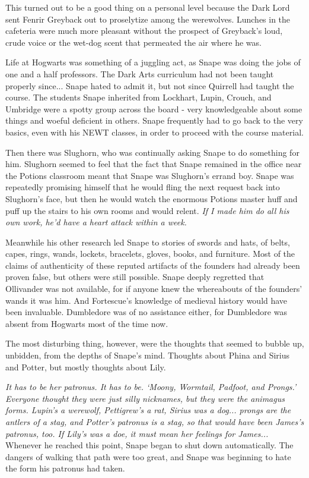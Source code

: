 \documentclass[a4paper,11pt]{article}
\begin{document}
This turned out to be a good thing on a personal level because the Dark Lord sent Fenrir Greyback out to proselytize among the werewolves. Lunches in the cafeteria were much more pleasant without the prospect of Greyback's loud, crude voice or the wet-dog scent that permeated the air where he was.

Life at Hogwarts was something of a juggling act, as Snape was doing the jobs of one and a half professors. The Dark Arts curriculum had not been taught properly since... Snape hated to admit it, but not since Quirrell had taught the course. The students Snape inherited from Lockhart, Lupin, Crouch, and Umbridge were a spotty group across the board - very knowledgeable about some things and woeful deficient in others. Snape frequently had to go back to the very basics, even with his NEWT classes, in order to proceed with the course material.

Then there was Slughorn, who was continually asking Snape to do something for him. Slughorn seemed to feel that the fact that Snape remained in the office near the Potions classroom meant that Snape was Slughorn's errand boy. Snape was repeatedly promising himself that he would fling the next request back into Slughorn's face, but then he would watch the enormous Potions master huff and puff up the stairs to his own rooms and would relent. \emph{If I made him do all his own work, he'd have a heart attack within a week.}

Meanwhile his other research led Snape to stories of swords and hats, of belts, capes, rings, wands, lockets, bracelets, gloves, books, and furniture. Most of the claims of authenticity of these reputed artifacts of the founders had already been proven false, but others were still possible. Snape deeply regretted that Ollivander was not available, for if anyone knew the whereabouts of the founders' wands it was him. And Fortescue's knowledge of medieval history would have been invaluable. Dumbledore was of no assistance either, for Dumbledore was absent from Hogwarts most of the time now.

The most disturbing thing, however, were the thoughts that seemed to bubble up, unbidden, from the depths of Snape's mind. Thoughts about Phina and Sirius and Potter, but mostly thoughts about Lily.

\emph{It has to be her patronus. It has to be. `Moony, Wormtail, Padfoot, and Prongs.' Everyone thought they were just silly nicknames, but they were the animagus forms. Lupin's a werewolf, Pettigrew's a rat, Sirius was a dog... prongs are the antlers of a stag, and Potter's patronus is a stag, so that would have been James's patronus, too. If Lily's was a doe, it must mean her feelings for James...} Whenever he reached this point, Snape began to shut down automatically. The dangers of walking that path were too great, and Snape was beginning to hate the form his patronus had taken.
\end{document}
